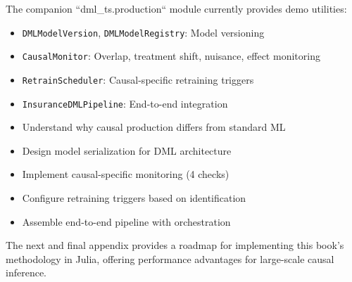 The companion ``dml\_ts.production`` module currently provides demo utilities:
\begin{itemize}
    \item \texttt{DMLModelVersion}, \texttt{DMLModelRegistry}: Model versioning
    \item \texttt{CausalMonitor}: Overlap, treatment shift, nuisance, effect monitoring
    \item \texttt{RetrainScheduler}: Causal-specific retraining triggers
    \item \texttt{InsuranceDMLPipeline}: End-to-end integration
\end{itemize}

\vspace{1em}

\begin{tcolorbox}[colback=gray!5, colframe=gray!75, title={Chapter Checklist}]
\begin{itemize}
    \item[$\square$] Understand why causal production differs from standard ML
    \item[$\square$] Design model serialization for DML architecture
    \item[$\square$] Implement causal-specific monitoring (4 checks)
    \item[$\square$] Configure retraining triggers based on identification
    \item[$\square$] Assemble end-to-end pipeline with orchestration
\end{itemize}
\end{tcolorbox}

The next and final appendix provides a roadmap for implementing this book's methodology in Julia, offering performance advantages for large-scale causal inference.
